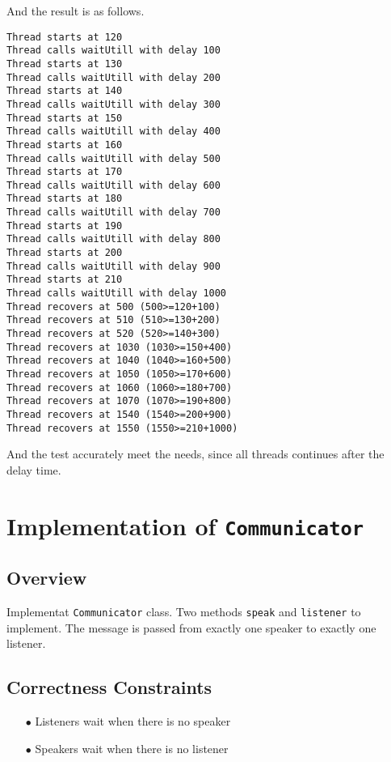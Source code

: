 \documentclass{article}
\begin{document}
 And the result is as follows.
\begin{lstlisting}
Thread starts at 120
Thread calls waitUtill with delay 100
Thread starts at 130
Thread calls waitUtill with delay 200
Thread starts at 140
Thread calls waitUtill with delay 300
Thread starts at 150
Thread calls waitUtill with delay 400
Thread starts at 160
Thread calls waitUtill with delay 500
Thread starts at 170
Thread calls waitUtill with delay 600
Thread starts at 180
Thread calls waitUtill with delay 700
Thread starts at 190
Thread calls waitUtill with delay 800
Thread starts at 200
Thread calls waitUtill with delay 900
Thread starts at 210
Thread calls waitUtill with delay 1000
Thread recovers at 500 (500>=120+100)
Thread recovers at 510 (510>=130+200)
Thread recovers at 520 (520>=140+300)
Thread recovers at 1030 (1030>=150+400)
Thread recovers at 1040 (1040>=160+500)
Thread recovers at 1050 (1050>=170+600)
Thread recovers at 1060 (1060>=180+700)
Thread recovers at 1070 (1070>=190+800)
Thread recovers at 1540 (1540>=200+900)
Thread recovers at 1550 (1550>=210+1000)
\end{lstlisting}

And the test accurately meet the needs, since all threads continues after the delay time.
\section{Implementation of \texttt{Communicator}}
\subsection{Overview}
Implementat \texttt{Communicator} class. Two methods \texttt{speak} and \texttt{listener} to implement. The message is passed from exactly one 
speaker to exactly one listener.
\subsection{Correctness Constraints}
\begin{enumerate}
	\item[$\bullet$] Listeners wait when there is no speaker
	\item[$\bullet$] Speakers wait when there is no listener
\end{enumerate}
\end{document}
